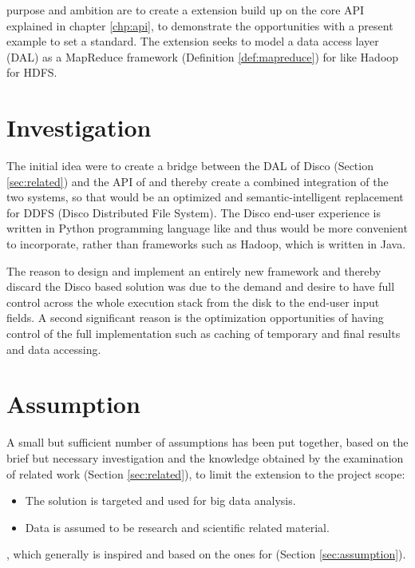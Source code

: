  purpose and ambition are to create a \CodeName extension build up on the core API explained in chapter \ref{chp:api}, to demonstrate the opportunities with a present example to set a standard. The extension seeks to model a data access layer (DAL) as a MapReduce framework (Definition \ref{def:mapreduce}) for \CodeName like Hadoop for HDFS.

\section{Investigation}
The initial idea were to create a bridge between the DAL of Disco (Section \ref{sec:related}) and the API of \CodeName and thereby create a combined integration of the two systems, so that \CodeName would be an optimized and semantic-intelligent replacement for DDFS (Disco Distributed File System). The Disco end-user experience is written in Python programming language like \CodeName and thus would be more convenient to incorporate, rather than frameworks such as Hadoop, which is written in Java.
\newline

The reason to design and implement an entirely new framework and thereby discard the Disco based solution was due to the demand and desire to have full control across the whole execution stack from the disk to the end-user input fields. A second significant reason is the optimization opportunities of having control of the full implementation such as caching of temporary and final results and data accessing.

\section{Assumption}
A small but sufficient number of assumptions has been put together, based on the brief but necessary investigation and the knowledge obtained by the examination of related work (Section \ref{sec:related}), to limit the extension to the project scope:

\begin{itemize}
	\item The solution is targeted and used for big data analysis.	
	\item Data is assumed to be research and scientific related material. 
\end{itemize}
, which generally is inspired and based on the ones for \CodeName (Section \ref{sec:assumption}).
\newline


